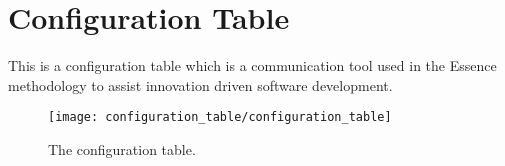 \chapter{Configuration Table}
\label{app:configuration_table}

This is a configuration table which is a communication tool used in the Essence methodology to assist innovation driven software development.

\begin{figure}[!htbp]
    \centering
    \texttt{[image: configuration\_table/configuration\_table]}
    \caption{The configuration table.}
    \label{fig:configuration_table}
\end{figure}
\FloatBarrier